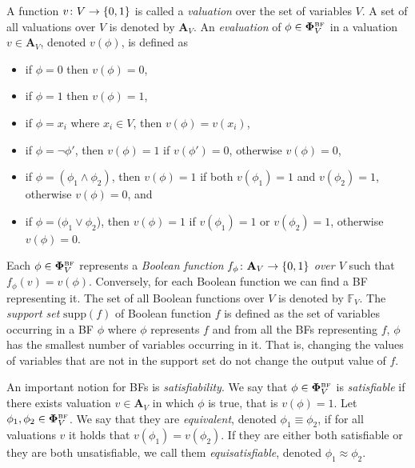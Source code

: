 \documentclass[
  digital, %
  color,
  twoside, %
  table,   %
  nolof,     %
  nolot,     %
]{fithesis3}
\let\setbuilder\set
\newcommand{\simpleset}[1]{\{{#1}\}}
\renewcommand{\set}[1]{\normalexpandarg\IfSubStr{#1}{|}{\setbuilder{#1}}{\simpleset{#1}}}
\theoremstyle{definition}
\theoremstyle{remark}
\newcommand{\BF}[1]{\mathbf{\Phi}_{#1}^{\normalfont{\text{\tiny BF}}}}
\newcommand{\valtns}[1]{\mathbf{A}_{#1}}
\newcommand{\BFuncs}[1]{\mathbb{F}_{#1}}
\newcommand{\supp}[1]{\mathrm{supp}(#1)}
\begin{document}
A function $v\colon V \to \set{0,1}$ is called a \emph{valuation} over the set of variables $V$. A set of all valuations over $V$ is denoted by $\valtns{V}$. An \emph{evaluation} of $\phi \in \BF{V}$ in a valuation $v \in \valtns{V}$, denoted $v(\phi)$, is defined as %
\begin{itemize}
    \item if $\phi = 0$ then $v(\phi) = 0$,
    \item if $\phi = 1$ then $v(\phi) = 1$,
    \item if $\phi = x_i$ where $x_i \in V$, then $v(\phi) = v(x_i)$,
    \item if $\phi = \neg\phi'$, then $v(\phi) = 1$ if $v(\phi') = 0$, otherwise $v(\phi) = 0$,
    \item if $\phi = (\phi_1 \land \phi_2)$, then $v(\phi) = 1$ if both $v(\phi_1) = 1$ and $v(\phi_2) = 1$, otherwise $v(\phi) = 0$, and
    \item if $\phi = (\phi_1 \lor \phi_2$), then $v(\phi) = 1$ if $v(\phi_1) = 1$ or $v(\phi_2) = 1$, otherwise $v(\phi) = 0$.
\end{itemize}
Each $\phi \in \BF{V}$ represents a \emph{Boolean function} $f_{\phi}\colon \valtns{V} \to \set{0,1}$ \emph{over $V$} such that $f_{\phi}(v) = v(\phi)$. Conversely, for each Boolean function we can find a BF representing it. The set of all Boolean functions over $V$ is denoted by $\BFuncs{V}$. The \emph{support set} $\supp{f}$ of Boolean function $f$ is defined as the set of variables occurring in a BF $\phi$ where $\phi$ represents $f$ and from all the BFs representing $f$, $\phi$ has the smallest number of variables occurring in it. That is, changing the values of variables that are not in the support set do not change the output value of $f$.


An important notion for BFs is \emph{satisfiability}. We say that $\phi \in \BF{V}$ is \emph{satisfiable} if there exists valuation $v \in \valtns{V}$ in which $\phi$ is true, that is $v(\phi) = 1$. Let $\phi_1, \phi_2 \in \BF{V}$. We say that they are \emph{equivalent}, denoted $\phi_1 \equiv \phi_2$, if for all valuations $v$ it holds that $v(\phi_1) = v(\phi_2)$. If they are either both satisfiable or they are both unsatisfiable, we call them \emph{equisatisfiable}, denoted $\phi_1 \approx \phi_2$.
\end{document}

